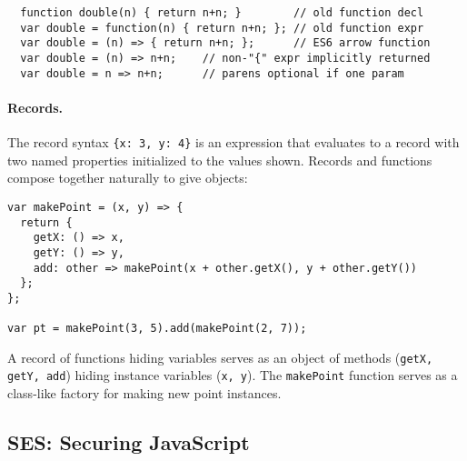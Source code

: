 \documentclass{llncs}
\begin{document}
\begin{verbatim}
  function double(n) { return n+n; }        // old function decl
  var double = function(n) { return n+n; }; // old function expr
  var double = (n) => { return n+n; };      // ES6 arrow function
  var double = (n) => n+n;    // non-"{" expr implicitly returned
  var double = n => n+n;      // parens optional if one param
\end{verbatim}

\paragraph{Records.} The record syntax {\tt \{x: 3, y: 4\}} is an expression that evaluates to a record with two named properties initialized to the values shown. Records and functions compose together naturally to give objects:

\begin{verbatim}
var makePoint = (x, y) => {
  return {
    getX: () => x,
    getY: () => y,
    add: other => makePoint(x + other.getX(), y + other.getY())
  };
};

var pt = makePoint(3, 5).add(makePoint(2, 7));
\end{verbatim}

A record of functions hiding variables serves as an object of methods ({\tt getX, getY, add}) hiding instance variables ({\tt x, y}). The {\tt makePoint} function serves as a class-like factory for making new point instances.


\subsection{SES: Securing JavaScript}

\end{document}
